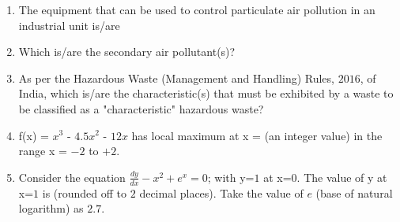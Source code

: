 \documentclass[journal]{IEEEtran}
\numberwithin{equation}{enumi}
\numberwithin{figure}{enumi}
\begin{document}
\begin{enumerate}[start=1, label={Q\arabic*.}]
\begin{itemize}
  \end{itemize}
\item The equipment that can be used to control particulate air pollution in an industrial unit
is/are
\begin{enumerate}[label=(\Alph*)]
  \end{enumerate}
\item Which is/are the secondary air pollutant(s)?
 \begin{enumerate}[label=(\Alph*)]
  \end{enumerate}
  \newpage
\item As per the Hazardous Waste (Management and Handling) Rules, $2016$, of India, which
is/are the characteristic(s) that must be exhibited by a waste to be classified as a
"characteristic" hazardous waste?
 \begin{enumerate}[label=(\Alph*)]
\end{enumerate}
\item f(x) = $x^3$ - $4.5x^2$ - $12x$ has local maximum at x = \underline{\hspace{1.5cm}}(an integer value) in the range x = $-2$ to $+2$.
\vspace{0.1cm}
\item Consider the equation $\frac{dy}{dx}- x^{2} + e^{x} = 0$; with y=$1$ at x=$0$. The value of y at x=$1$ is \underline{\hspace{1.5cm}}(rounded off to $2$ decimal places). Take the value of $e$ (base of natural logarithm) as $2.7$.

\end{enumerate}
\end{document}
